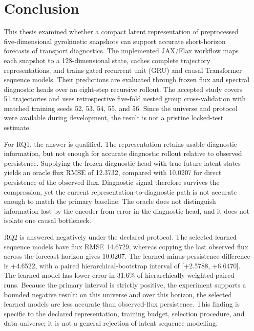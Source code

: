 \cleardoubleoddpage
\chapter{Conclusion}
\label{chap:conclusion}

This thesis examined whether a compact latent representation of preprocessed five-dimensional
gyrokinetic snapshots can support accurate short-horizon forecasts of transport diagnostics. The
implemented JAX/Flax workflow maps each snapshot to a 128-dimensional state, caches complete
trajectory representations, and trains gated recurrent unit (GRU) and causal Transformer sequence
models. Their predictions are evaluated through frozen flux and spectral diagnostic heads over an
eight-step recursive rollout. The accepted study covers 51 trajectories and uses retrospective
five-fold nested group cross-validation with matched training seeds 52, 53, 54, 55, and 56. Since
the universe and protocol were available during development, the result is not a pristine
locked-test estimate.

For RQ1, the answer is qualified. The representation retains usable diagnostic information, but not
enough for accurate diagnostic rollout relative to observed persistence. Supplying the frozen
diagnostic head with true future latent states yields an oracle flux RMSE of 12.3732, compared with
10.0207 for direct persistence of the observed flux. Diagnostic signal therefore survives the
compression, yet the current representation-to-diagnostic path is not accurate enough to match the
primary baseline. The oracle does not distinguish information lost by the encoder from error in the
diagnostic head, and it does not isolate one causal bottleneck.

RQ2 is answered negatively under the declared protocol. The selected learned sequence models have
flux RMSE 14.6729, whereas copying the last observed flux across the forecast horizon gives 10.0207.
The learned-minus-persistence difference is +4.6522, with a paired hierarchical-bootstrap interval
of [+2.5788, +6.6470]. The learned model has lower error in 31.6\% of hierarchically weighted
paired runs. Because the primary interval is strictly positive, the experiment supports a bounded
negative result: on this universe and over this horizon, the selected learned models are less
accurate than observed-flux persistence. This finding is specific to the declared representation,
training budget, selection procedure, and data universe; it is not a general rejection of latent
sequence modelling.

